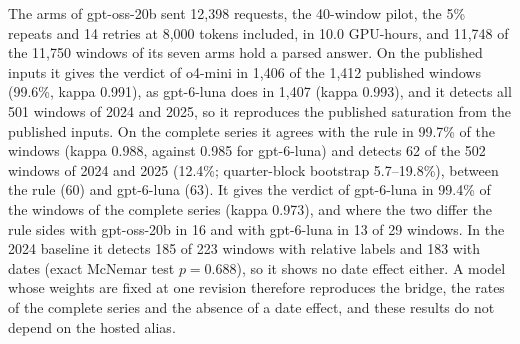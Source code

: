 The arms of gpt-oss-20b sent 12{,}398 requests, the 40-window pilot, the 5\% repeats and 14 retries at 8{,}000 tokens included, in 10.0 GPU-hours, and 11{,}748 of the 11{,}750 windows of its seven arms hold a parsed answer. On the published inputs it gives the verdict of o4-mini in 1{,}406 of the 1{,}412 published windows (99.6\%, kappa 0.991), as gpt-6-luna does in 1{,}407 (kappa 0.993), and it detects all 501 windows of 2024 and 2025, so it reproduces the published saturation from the published inputs. On the complete series it agrees with the rule in 99.7\% of the windows (kappa 0.988, against 0.985 for gpt-6-luna) and detects 62 of the 502 windows of 2024 and 2025 (12.4\%; quarter-block bootstrap 5.7--19.8\%), between the rule (60) and gpt-6-luna (63). It gives the verdict of gpt-6-luna in 99.4\% of the windows of the complete series (kappa 0.973), and where the two differ the rule sides with gpt-oss-20b in 16 and with gpt-6-luna in 13 of 29 windows. In the 2024 baseline it detects 185 of 223 windows with relative labels and 183 with dates (exact McNemar test $p=0.688$), so it shows no date effect either. A model whose weights are fixed at one revision therefore reproduces the bridge, the rates of the complete series and the absence of a date effect, and these results do not depend on the hosted alias.

